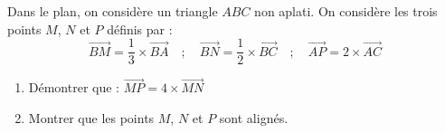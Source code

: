 \begin{exo}{}
	Dans le plan, on considère un triangle $ABC$ non aplati. On considère les trois points $M$, $N$ et $P$ définis par :
	$$\vec{BM} = \frac{1}{3}\times\vec{BA} \quad ; \quad \vec{BN} = \frac{1}{2}\times\vec{BC} \quad ; \quad \vec{AP} = 2\times\vec{AC}$$
	\begin{enumerate}
		\item Démontrer que : $\vec{MP}= 4\times\vec{MN}$
		\item Montrer que les points $M$, $N$ et $P$ sont alignés.
	\end{enumerate}
\end{exo}
